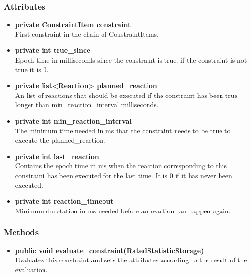 \subsubsection{Attributes}
\begin{itemize}
	\item \textbf{ private ConstraintItem constraint }\\
	First constraint in the chain of ConstraintItems.
	\item \textbf{ private int true\_since }\\
	Epoch time in milliseconds since the constraint is true,
	if the constraint is not true it is 0.
	\item \textbf{ private list<Reaction> planned\_reaction }\\
	An list of reactions that should be executed if the constraint has been true longer than min\_reaction\_interval milliseconds.
	\item \textbf{ private int min\_reaction\_interval }\\
	The minimum time needed in ms that the constraint needs to be true to execute the planned\_reaction.
	\item \textbf{ private int last\_reaction }\\
	Contains the epoch time in ms when the reaction corresponding to this constraint has been executed for the last time.
		It is 0 if it has never been executed.
	\item \textbf{ private int reaction\_timeout }\\
	Minimum durotation in ms needed before an reaction can happen again.
\end{itemize}
\subsubsection{Methods}
\begin{itemize}
	\item \textbf{ public void evaluate\_constraint(RatedStatisticStorage)  }\\
	Evaluates this constraint and sets the attributes according to the result of the evaluation.
\end{itemize}



\newpage
